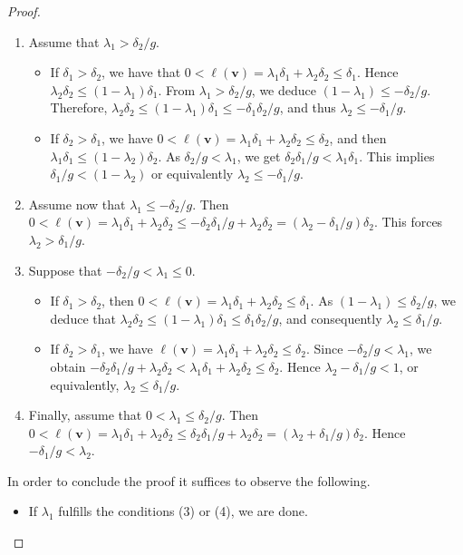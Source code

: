 \documentclass[11pt]{amsart}
\theoremstyle{remark}
\begin{document}
\begin{proof}
\begin{enumerate}[(1)]
\item Assume that $\lambda_1>\delta_2/g$.
 \begin{itemize}
 \item If $\delta_1>\delta_2$, we have that  $0<\ell(\mathbf v)=\lambda_1\delta_1+\lambda_2\delta_2\le \delta_1$.  Hence $\lambda_2\delta_2\le (1-\lambda_1)\delta_1$. From $\lambda_1>\delta_2/g$, we deduce  $(1-\lambda_1)\le-\delta_2/g$.  Therefore, $\lambda_2\delta_2\le (1-\lambda_1)\delta_1\le-\delta_1\delta_2/g$, and thus $\lambda_2\le -\delta_1/g$.
 \item If $\delta_2>\delta_1$, we have $0<\ell(\mathbf v)=\lambda_1\delta_1+\lambda_2\delta_2\le \delta_2$, and then $\lambda_1\delta_1\le (1-\lambda_2)\delta_2$. As $\delta_2/g<\lambda_1$, we get  $\delta_2\delta_1/g<\lambda_1\delta_1$. This implies  $\delta_1/g<(1-\lambda_2)$ or equivalently $\lambda_2\le -\delta_1/g$.
 \end{itemize}
\item Assume now that $\lambda_1\le -\delta_2/g$. Then  $0<\ell(\mathbf v)=\lambda_1\delta_1+\lambda_2\delta_2\le -\delta_2\delta_1/g+\lambda_2\delta_2=(\lambda_2-\delta_1/g)\delta_2$. This forces $\lambda_2>\delta_1/g$.
\item Suppose that $-\delta_2/g<\lambda_1\le 0$.
 \begin{itemize}
 \item If $\delta_1>\delta_2$, then $0<\ell(\mathbf v)=\lambda_1\delta_1+\lambda_2\delta_2\le \delta_1$. As $(1-\lambda_1)\le\delta_2/g$, we deduce that  $\lambda_2\delta_2\le (1-\lambda_1)\delta_1\le\delta_1\delta_2/g$, and consequently $\lambda_2\le \delta_1/g$.
 \item If $\delta_2>\delta_1$, we have $\ell(\mathbf v)=\lambda_1\delta_1+\lambda_2\delta_2\le \delta_2$. Since $-\delta_2/g<\lambda_1$, we obtain  $-\delta_2\delta_1/g+\lambda_2\delta_2<\lambda_1\delta_1+\lambda_2\delta_2\le \delta_2$. Hence  $\lambda_2-\delta_1/g<1$, or equivalently, $\lambda_2\le \delta_1/g$.
 \end{itemize}
\item Finally, assume that $0<\lambda_1\le \delta_2/g$. Then $0<\ell(\mathbf v)=\lambda_1\delta_1+\lambda_2\delta_2\le \delta_2\delta_1/g+\lambda_2\delta_2=(\lambda_2+\delta_1/g)\delta_2$. Hence $-\delta_1/g<\lambda_2$.
\end{enumerate}
In order to conclude the proof it suffices to observe the following. 
\begin{itemize}
	\item If $\lambda_1$ fulfills the conditions (3) or (4), we are done.

\end{itemize}
\end{proof}
\end{document}
